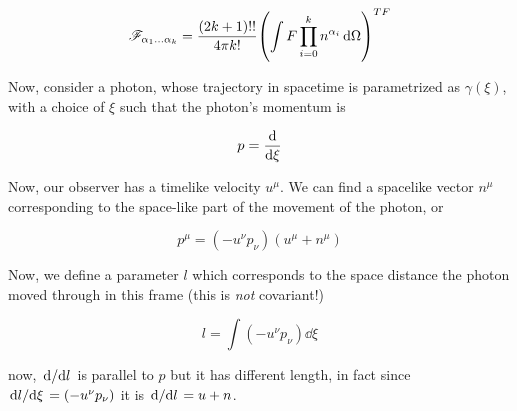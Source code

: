 \documentclass[main.tex]{subfiles}
\begin{document}
\begin{equation}
    \mathscr F_{\alpha_1 \dots \alpha_k} =
    \frac{(2k+1)!!}{4 \pi k!} \qty(\int F \prod_{i=0}^k n^{\alpha_i}  \dd{\Omega}  )^{TF}
\end{equation}

Now, consider a photon, whose trajectory in spacetime is parametrized as \(\gamma(\xi)\), with a choice of \(\xi\) such that the photon's momentum is

\begin{equation}
    p = \dv{}{\xi}
\end{equation}

Now, our observer has a timelike velocity \(u^\mu\). We can find a spacelike vector \(n^\mu\) corresponding to the space-like part of the movement of the photon, or

\begin{equation}
    p^\mu = (- u^\nu p_\nu) (u^\mu + n^\mu)
\end{equation}

Now, we define a parameter \(l\) which corresponds to the space distance the photon moved through in this frame (this is \emph{not} covariant!)

\begin{equation}
    l = \int  (-u^\nu p_\nu) \dd{\xi}
\end{equation}

now, \(\dv*{}{l} \) is parallel to \(p\) but it has different length, in fact since \(\dv*{l}{\xi} = (-u^\nu p_\nu) \) it is \(\dv*{}{l} = u + n \).
\end{document}
